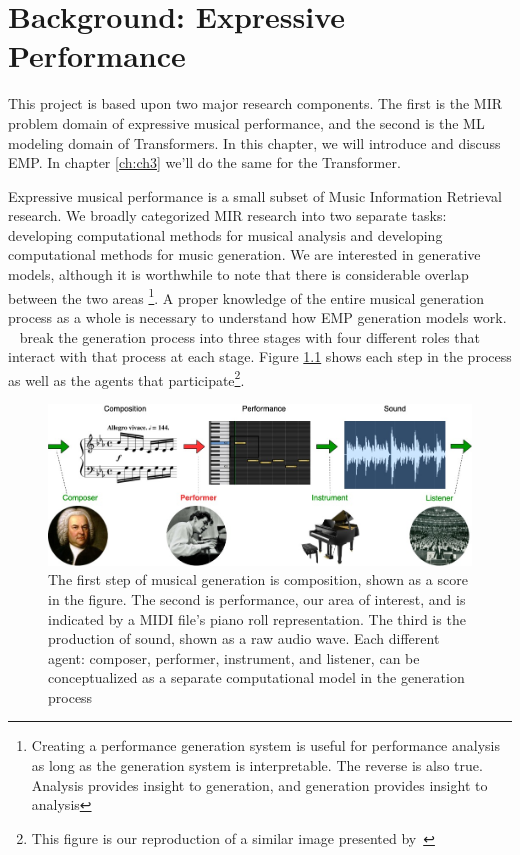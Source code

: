
\chapter{Background: Expressive Performance}\label{ch:ch2}
This project is based upon two major research components. The first is the MIR problem domain of expressive musical performance, and the second is the ML modeling domain of Transformers. In this chapter, we will introduce and discuss EMP. In chapter \ref{ch:ch3} we'll do the same for the Transformer. 

Expressive musical performance is a small subset of Music Information Retrieval research. We broadly categorized MIR research into two separate tasks: developing computational methods for musical analysis and developing computational methods for music generation. We are interested in generative models, although it is worthwhile to note that there is considerable overlap between the two areas%
\footnote{Creating a performance generation system is useful for performance analysis as long as the generation system is interpretable. The reverse is also true. Analysis provides insight to generation, and generation provides insight to analysis}. A proper knowledge of the entire musical generation process as a whole is necessary to understand how EMP generation models work. ~\citet{ji2020comprehensive} break the generation process into three stages with four different roles that interact with that process at each stage. Figure \ref{fig:generation_process} shows each step in the process as well as the agents that participate\footnote{This figure is our reproduction of a similar image presented by~\citet{ji2020comprehensive}}. 

\begin{figure}
    \centering
    \includegraphics[width=1\linewidth]{figs/ch2/musical_generation.jpg}
    \caption{The first step of musical generation is composition, shown as a score in the figure. The second is performance, our area of interest, and is indicated by a MIDI file's piano roll representation. The third is the production of sound, shown as a raw audio wave. Each different agent: composer, performer, instrument, and listener, can be conceptualized as a separate computational model in the generation process}
    \label{fig:generation_process}
\end{figure}

